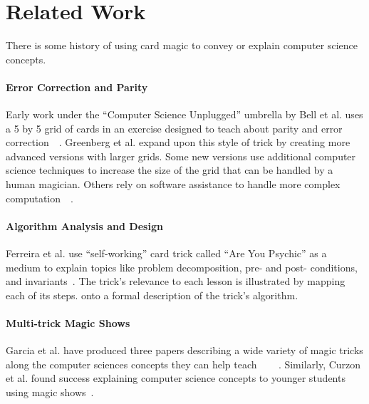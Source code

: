 \section{Related Work}
\label{SEC:related-work}

There is some history of using card magic to convey or explain computer science
concepts.

\paragraph{Error Correction and Parity}
Early work under the ``Computer Science Unplugged'' umbrella by Bell et al. uses
a 5 by 5 grid of cards in an exercise designed to teach about parity and
error correction~\cite{bell2009computer}~\cite{csunplugged}.
Greenberg et al. expand upon this style of trick by creating more advanced
versions with larger grids.  Some new versions use additional computer science
techniques to increase the size of the grid that can be handled by a human
magician.  Others rely on software assistance to handle more complex
computation~\cite{Greenberg2017}~\cite{Greenberg2018}.

\paragraph{Algorithm Analysis and Design}
Ferreira et al. use ``self-working'' card trick called ``Are You Psychic''
as a medium to explain topics
like problem decomposition, pre- and post- conditions, and
invariants~\cite{ferreira2014magic}.
The trick's relevance to each lesson is illustrated by
mapping each of its steps.
onto a formal description of the trick's algorithm.

\paragraph{Multi-trick Magic Shows}
Garcia et al. have produced three papers describing a wide variety of magic
tricks along the computer sciences concepts they can help
teach~\cite{garcia2012demystifying}
~\cite{garcia2013demystifying}
~\cite{garcia2016demystifying}.
Similarly, Curzon et al. found success explaining computer
science concepts to younger students using magic shows~\cite{Curzon2008}.
